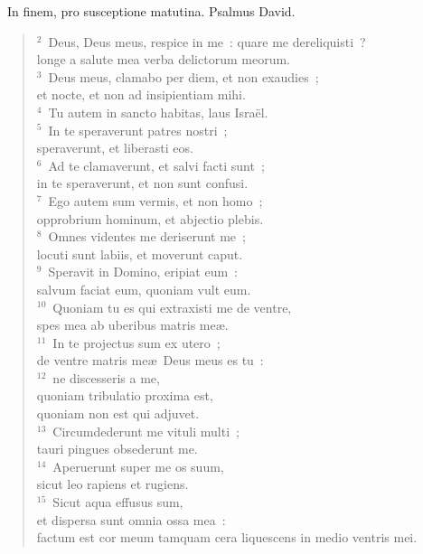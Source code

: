 ~\lettrine[lines=10,image=true,loversize=0.05,lraise=-0.03]{I}{}n finem, pro susceptione matutina. Psalmus David.
\begin{flushleft}\begin{verse}\vspace{6pt}${}^{2}$~Deus, Deus meus, respice in me~: quare me dereliquisti~?\\ longe a salute mea verba delictorum meorum.\\
${}^{3}$~Deus meus, clamabo per diem, et non exaudies~;\\ et nocte, et non ad insipientiam mihi.\\
${}^{4}$~Tu autem in sancto habitas, laus Isra\"el.\\
${}^{5}$~In te speraverunt patres nostri~;\\ speraverunt, et liberasti eos.\\
${}^{6}$~Ad te clamaverunt, et salvi facti sunt~;\\ in te speraverunt, et non sunt confusi.\\
${}^{7}$~Ego autem sum vermis, et non homo~;\\ opprobrium hominum, et abjectio plebis.\\
${}^{8}$~Omnes videntes me deriserunt me~;\\ locuti sunt labiis, et moverunt caput.\\
${}^{9}$~Speravit in Domino, eripiat eum~:\\ salvum faciat eum, quoniam vult eum.\\
${}^{10}$~Quoniam tu es qui extraxisti me de ventre,\\ spes mea ab uberibus matris me\ae .\\
${}^{11}$~In te projectus sum ex utero~;\\ de ventre matris me\ae\ Deus meus es tu~:\\
${}^{12}$~ne discesseris a me,\\ quoniam tribulatio proxima est,\\ quoniam non est qui adjuvet.\\
${}^{13}$~Circumdederunt me vituli multi~;\\ tauri pingues obsederunt me.\\
${}^{14}$~Aperuerunt super me os suum,\\ sicut leo rapiens et rugiens.\\
${}^{15}$~Sicut aqua effusus sum,\\ et dispersa sunt omnia ossa mea~:\\ factum est cor meum tamquam cera liquescens in medio ventris mei.\\

\end{verse}
\end{flushleft}
